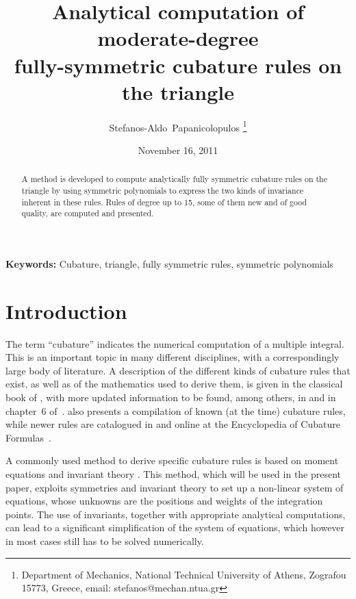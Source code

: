 \documentclass{article}
\begin{document}
\title{Analytical computation of moderate-degree\\ fully-symmetric cubature rules on the triangle}

\author{Stefanos-Aldo~Papanicolopulos%
\thanks{Department of Mechanics, National Technical University of Athens, Zografou 15773, Greece, email: stefanos@mechan.ntua.gr}}

\date{November 16, 2011}

\maketitle



\begin{abstract}
A method is developed to compute analytically fully symmetric cubature rules on the triangle by using symmetric polynomials to express the two kinds of invariance inherent in these rules. Rules of degree up to 15, some of them new and of good quality, are computed and presented.
\end{abstract}

\textbf{Keywords:}
Cubature, triangle, fully symmetric rules, symmetric polynomials





\section{Introduction}
  \label{sec:intro}

The term ``cubature'' indicates the numerical computation of a multiple integral. This is an important topic in many different disciplines, with a correspondingly large body of literature. A description of the different kinds of cubature rules that exist, as well as of the mathematics used to derive them, is given in the classical book of \citet{Stroud1971}, with more updated information to be found, among others, in \citep{Cools1997} and in chapter~6 of~\citep{KrommerUeberhuber1998}.  also presents a compilation of known (at the time) cubature rules, while newer rules are catalogued in \citep{CoolsRabinowitz1993,Cools1999} and online at the Encyclopedia of Cubature Formulas~\citep{Cools2003}.

A commonly used method to derive specific cubature rules is based on moment equations and invariant theory \citep[pp.~170--182]{KrommerUeberhuber1998}. This method, which will be used in the present paper, exploits symmetries and invariant theory to set up a non-linear system of equations, whose unknowns are the positions and weights of the integration points. The use of invariants, together with appropriate analytical computations, can lead to a significant simplification of the system of equations, which however in most cases still has to be solved numerically.
\end{document}
